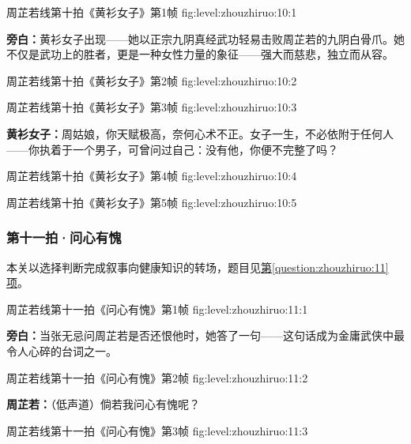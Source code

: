   {周芷若线第十拍《黄衫女子》第1帧}
  {fig:level:zhouzhiruo:10:1}
  {\scriptsize}
  {\textbf{旁白：}黄衫女子出现——她以正宗九阴真经武功轻易击败周芷若的九阴白骨爪。她不仅是武功上的胜者，更是一种女性力量的象征——强大而慈悲，独立而从容。\par}

  {周芷若线第十拍《黄衫女子》第2帧}
  {fig:level:zhouzhiruo:10:2}
  {\scriptsize}
  {\mbox{}}

  {周芷若线第十拍《黄衫女子》第3帧}
  {fig:level:zhouzhiruo:10:3}
  {\scriptsize}
  {\textbf{黄衫女子：}周姑娘，你天赋极高，奈何心术不正。女子一生，不必依附于任何人——你执着于一个男子，可曾问过自己：没有他，你便不完整了吗？\par}

\clearpage

  {周芷若线第十拍《黄衫女子》第4帧}
  {fig:level:zhouzhiruo:10:4}
  {\scriptsize}
  {\mbox{}}

  {周芷若线第十拍《黄衫女子》第5帧}
  {fig:level:zhouzhiruo:10:5}
  {\scriptsize}
  {\mbox{}}

\subsubsection{第十一拍·问心有愧}\label{plot:zhouzhiruo:11}
本关以选择判断完成叙事向健康知识的转场，题目见\hyperref[question:zhouzhiruo:11]{第\ref*{question:zhouzhiruo:11}项}。

  {周芷若线第十一拍《问心有愧》第1帧}
  {fig:level:zhouzhiruo:11:1}
  {\scriptsize}
  {\textbf{旁白：}当张无忌问周芷若是否还恨他时，她答了一句——这句话成为金庸武侠中最令人心碎的台词之一。\par}

\clearpage

  {周芷若线第十一拍《问心有愧》第2帧}
  {fig:level:zhouzhiruo:11:2}
  {\scriptsize}
  {\textbf{周芷若：}（低声道）倘若我问心有愧呢？\par}

  {周芷若线第十一拍《问心有愧》第3帧}
  {fig:level:zhouzhiruo:11:3}
  {\scriptsize}
  {\mbox{}}

